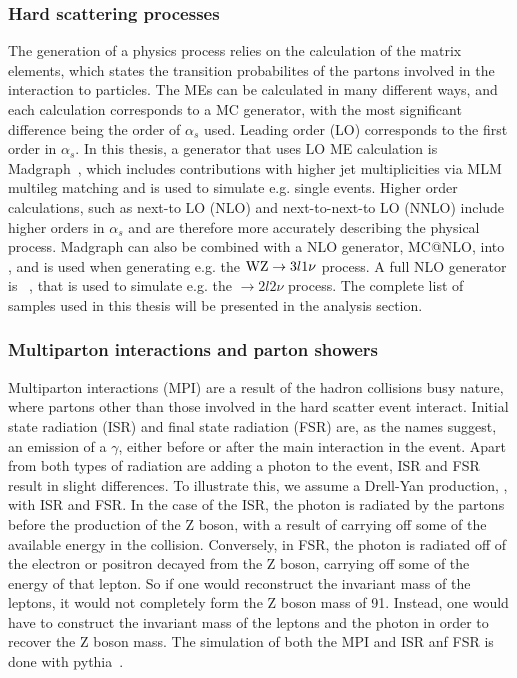 \subsubsection{Hard scattering processes}
The generation of a physics process relies on the calculation of the matrix elements, which states the transition probabilites of the partons involved in the interaction to particles. 
The MEs can be calculated in many different ways, and each calculation corresponds to a MC generator, with the most significant difference being the order of $\alpha_{s}$ used. 
Leading order (LO) corresponds to the first order in $\alpha_{s}$. 
In this thesis, a generator that uses LO ME calculation is Madgraph~\cite{Alwall:2014hca}, which includes contributions with higher jet multiplicities via MLM~\cite{Mangano:2006rw} multileg matching and is used to simulate e.g. single \PGg events.
Higher order calculations, such as next-to LO (NLO) and next-to-next-to LO (NNLO) include higher orders in $\alpha_{s}$ and are therefore more accurately describing the physical process. 
Madgraph can also be combined with a NLO generator, MC@NLO, into \MGvATNLO, and is used when generating e.g. the $\mathrm{W}\mathrm{Z}\rightarrow 3l1\nu$ process.
A full NLO generator is \POWHEG~\cite{Oleari:2010nx,Alioli:2009je}, that is used to simulate e.g. the \ttbar$\rightarrow2l2\nu$ process. 
The complete list of samples used in this thesis will be presented in the analysis section.
\subsubsection{Multiparton interactions and parton showers}
Multiparton interactions (MPI) are a result of the hadron collisions busy nature, where partons other than those involved in the hard scatter event interact. 
Initial state radiation (ISR) and final state radiation (FSR) are, as the names suggest, an emission of a $\gamma$, either before or after the main interaction in the event.
Apart from both types of radiation are adding a photon to the event, ISR and FSR result in slight differences. To illustrate this, we assume a Drell-Yan production, \Zee, with ISR and FSR. 
In the case of the ISR, the photon is radiated by the partons before the production of the Z boson, with a result of carrying off some of the available energy in the collision. 
Conversely, in FSR, the photon is radiated off of the electron or positron decayed from the Z boson, carrying off some of the energy of that lepton. 
So if one would reconstruct the invariant mass of the leptons, it would not completely form the Z boson mass of 91\GeV. 
Instead, one would have to construct the invariant mass of the leptons and the photon in order to recover the Z boson mass. 
The simulation of both the MPI and ISR anf FSR is done with {\sc pythia}~\cite{Sjostrand:2014zea}. 
